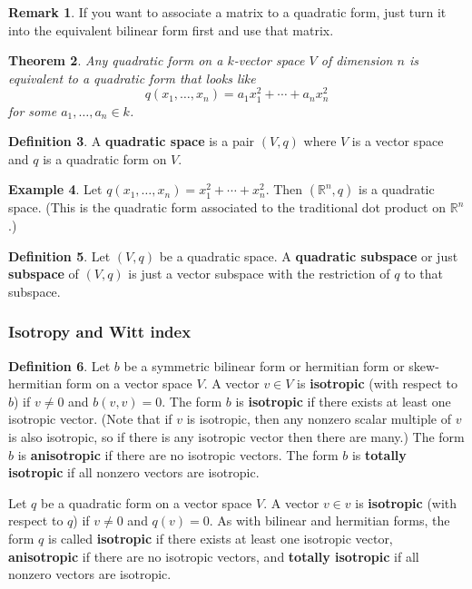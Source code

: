 \documentclass[12pt]{article}
\newtheorem{theorem}{Theorem}
\theoremstyle{definition}
\newtheorem{definition}[theorem]{Definition}
\newtheorem{example}[theorem]{Example}
\newtheorem{remark}[theorem]{Remark}
\numberwithin{theorem}{subsection}
\newcommand{\R}{\mathbb{R}}
\newcommand{\tbf}{\textbf}
\begin{document}
\begin{remark}
If you want to associate a matrix to a quadratic form, just turn it into the equivalent bilinear form first and use that matrix.
\end{remark}

\begin{theorem}
Any quadratic form on a $k$-vector space $V$ of dimension $n$ is equivalent to a quadratic form that looks like
\[
	q(x_1, \ldots, x_n) = a_1 x_1^2 + \cdots + a_n x_n^2
\]
for some $a_1, \ldots, a_n \in k$.
\end{theorem}

\begin{definition}
A \tbf{quadratic space} is a pair $(V,q)$ where $V$ is a vector space and $q$ is a quadratic form on $V$.
\end{definition}

\begin{example}
Let $q(x_1, \ldots, x_n) = x_1^2 + \cdots + x_n^2$. Then $(\R^n, q)$ is a quadratic space. (This is the quadratic form associated to the traditional dot product on $\R^n$.)
\end{example}

\begin{definition}
Let $(V,q)$ be a quadratic space. A \tbf{quadratic subspace} or just \tbf{subspace} of $(V,q)$ is just a vector subspace with the restriction of $q$ to that subspace.
\end{definition}

\subsubsection{Isotropy and Witt index}

\begin{definition}
Let $b$ be a symmetric bilinear form or hermitian form or skew-hermitian form on a vector space $V$. A vector $v \in V$ is \tbf{isotropic} (with respect to $b$) if $v \neq 0$ and $b(v,v) = 0$. The form $b$ is \tbf{isotropic} if there exists at least one isotropic vector. (Note that if $v$ is isotropic, then any nonzero scalar multiple of $v$ is also isotropic, so if there is any isotropic vector then there are many.) The form $b$ is \tbf{anisotropic} if there are no isotropic vectors.  The form $b$ is \tbf{totally isotropic} if all nonzero vectors are isotropic.

Let $q$ be a quadratic form on a vector space $V$. A vector $v \in v$ is \tbf{isotropic} (with respect to $q$) if $v \neq 0$ and $q(v) = 0$. As with bilinear and hermitian forms, the form $q$ is called \tbf{isotropic} if there exists at least one isotropic vector, \tbf{anisotropic} if there are no isotropic vectors, and \tbf{totally isotropic} if all nonzero vectors are isotropic.
\end{definition}
\end{document}
